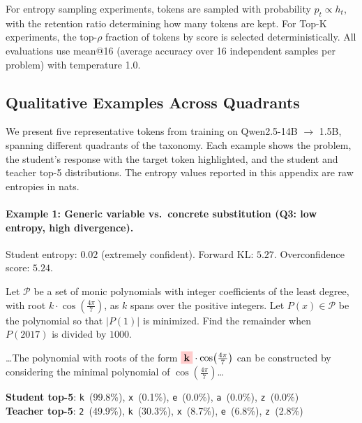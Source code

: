 \documentclass{article}
\begin{document}
For entropy sampling experiments, tokens are sampled with probability $p_t \propto h_t$, with the retention ratio determining how many tokens are kept.
For Top-K experiments, the top-$\rho$ fraction of tokens by score is selected deterministically.
All evaluations use mean@16 (average accuracy over 16 independent samples per problem) with temperature 1.0.

\subsection{Qualitative Examples Across Quadrants}
\label{app:qualitative}

We present five representative tokens from training on Qwen2.5-14B $\to$ 1.5B, spanning different quadrants of the taxonomy.
Each example shows the problem, the student's response with the \colorbox{red!20}{target token highlighted}, and the student and teacher top-5 distributions.
The entropy values reported in this appendix are raw entropies in nats.

\paragraph{Example 1: Generic variable vs.\ concrete substitution (\textbf{Q3}: low entropy, high divergence).}
Student entropy: $0.02$ (extremely confident). Forward KL: $5.27$. Overconfidence score: $5.24$.

\begin{tcolorbox}[colback=gray!5, colframe=black, boxrule=0.5pt, title={Problem}]
Let $\mathcal{P}$ be a set of monic polynomials with integer coefficients of the least degree, with root $k \cdot \cos\!\left(\frac{4\pi}{7}\right)$, as $k$ spans over the positive integers. Let $P(x) \in \mathcal{P}$ be the polynomial so that $|P(1)|$ is minimized. Find the remainder when $P(2017)$ is divided by $1000$.
\end{tcolorbox}

\begin{tcolorbox}[colback=blue!3, colframe=black, boxrule=0.5pt, title={Student response (excerpt)}]
\small
\ldots The polynomial with roots of the form $\colorbox{red!20}{\textbf{k}} \cdot \cos\!\left(\frac{4\pi}{7}\right)$ can be constructed by considering the minimal polynomial of $\cos\!\left(\frac{4\pi}{7}\right)$\ldots
\end{tcolorbox}

\begin{tcolorbox}[colback=yellow!5, colframe=black, boxrule=0.5pt, title={Token distributions}]
\small
\textbf{Student top-5}: \texttt{k}~(99.8\%), \texttt{x}~(0.1\%), \texttt{e}~(0.0\%), \texttt{a}~(0.0\%), \texttt{z}~(0.0\%) \\
\textbf{Teacher top-5}: \texttt{2}~(49.9\%), \texttt{k}~(30.3\%), \texttt{x}~(8.7\%), \texttt{e}~(6.8\%), \texttt{z}~(2.8\%)
\end{tcolorbox}
\end{document}
